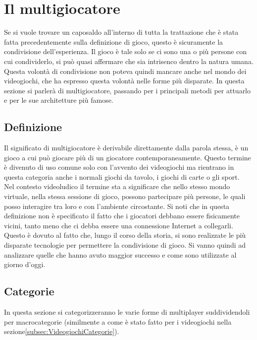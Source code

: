 \section{Il multigiocatore}\label{sec:Multigiocatore}
    Se si vuole trovare un caposaldo all'interno di tutta la trattazione che è stata fatta precedentemente sulla definizione di gioco, questo è sicuramente la condivisione dell'esperienza. 
    Il gioco è tale solo se ci sono una o più persone con cui condividerlo, si può quasi affermare che sia intrisenco dentro la natura umana. Questa volontà di condivisione 
    non poteva quindi mancare anche nel mondo dei videogiochi, che ha espresso questa volontà nelle forme più disparate. In questa sezione si parlerà di multigiocatore, passando per 
    i principali metodi per attuarlo e per le sue architetture più famose.
    \subsection{Definizione}\label{subsec:MultiDef}
        Il significato di multigiocatore è derivabile direttamente dalla parola stessa, è un gioco a cui può giocare più di un giocatore contemporaneamente. Questo termine è divenuto 
        di uso comune solo con l'avvento dei videogiochi ma rientrano in questa categoria anche i normali giochi da tavolo, i giochi di carte o gli sport.\\
        Nel contesto videoludico il termine sta a significare che nello stesso mondo virtuale, nella stessa sessione di gioco, possono partecipare più persone, le quali posso interagire
        tra loro e con l'ambiente circostante. Si noti che in questa definizione non è specificato il fatto che i giocatori debbano essere fisicamente vicini, tanto meno che ci 
        debba essere una connessione Internet a collegarli. Questo è dovuto al fatto che, lungo il corso della storia, si sono realizzate le più disparate tecnologie per permettere la
        condivisione di gioco. Si vanno quindi ad analizzare quelle che hanno avuto maggior successo e come sono utilizzate al giorno d'oggi.

    \subsection{Categorie}\label{subsec:MultiCategorie}
        In questa sezione si categorizzeranno le varie forme di multiplayer suddividendoli per macrocategorie (similmente a come è stato fatto per i videogiochi nella sezione\ref{subsec:VideogiochiCategorie}).

